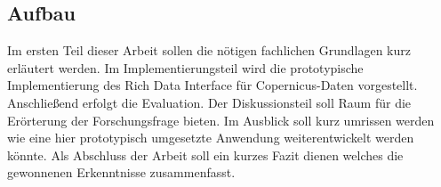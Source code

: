 \subsection{Aufbau} 
Im ersten Teil dieser Arbeit sollen die nötigen fachlichen Grundlagen kurz erläutert werden. 
Im Implementierungsteil wird die prototypische Implementierung des Rich Data Interface für Copernicus-Daten vorgestellt. 
Anschließend erfolgt die Evaluation.
Der Diskussionsteil soll Raum für die Erörterung der Forschungsfrage bieten. 
Im Ausblick soll kurz umrissen werden wie eine hier prototypisch umgesetzte Anwendung weiterentwickelt werden könnte. 
Als Abschluss der Arbeit soll ein kurzes Fazit dienen welches die gewonnenen Erkenntnisse zusammenfasst. 


